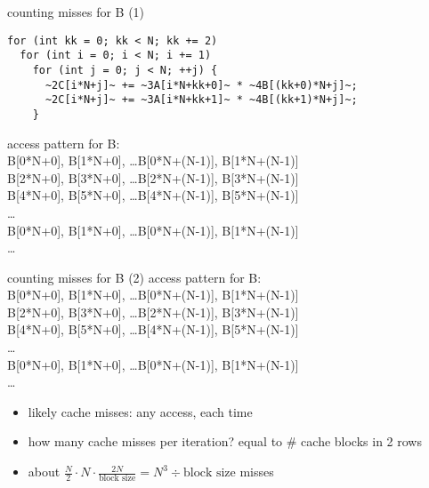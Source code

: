 \begin{frame}[fragile,label=cacheBlockKLoadsB]{counting misses for B (1)}
\begin{lstlisting}
for (int kk = 0; kk < N; kk += 2)
  for (int i = 0; i < N; i += 1)
    for (int j = 0; j < N; ++j) {
      ~2C[i*N+j]~ += ~3A[i*N+kk+0]~ * ~4B[(kk+0)*N+j]~;
      ~2C[i*N+j]~ += ~3A[i*N+kk+1]~ * ~4B[(kk+1)*N+j]~;
    }
\end{lstlisting}
access pattern for B: \\
B[0*N+0], B[1*N+0], \ldots B[0*N+(N-1)], B[1*N+(N-1)] \\
B[2*N+0], B[3*N+0], \ldots B[2*N+(N-1)], B[3*N+(N-1)] \\
B[4*N+0], B[5*N+0], \ldots B[4*N+(N-1)], B[5*N+(N-1)] \\
\ldots \\
B[0*N+0], B[1*N+0], \ldots B[0*N+(N-1)], B[1*N+(N-1)] \\
\ldots
\end{frame}

\begin{frame}{counting misses for B (2)}
access pattern for B: \\
B[0*N+0], B[1*N+0], \ldots B[0*N+(N-1)], B[1*N+(N-1)] \\
B[2*N+0], B[3*N+0], \ldots B[2*N+(N-1)], B[3*N+(N-1)] \\
B[4*N+0], B[5*N+0], \ldots B[4*N+(N-1)], B[5*N+(N-1)] \\
\ldots \\
B[0*N+0], B[1*N+0], \ldots B[0*N+(N-1)], B[1*N+(N-1)] \\
\ldots
\begin{itemize}
\item<2-> likely cache misses: any access, each time
\item<3-> how many cache misses per iteration? equal to \# cache blocks in 2 rows
\item<4-> about $\frac{N}{2}\cdot N\cdot\frac{2N}{\text{block size}}=N^3\div\text{block size}$ misses
\end{itemize}
\end{frame}


